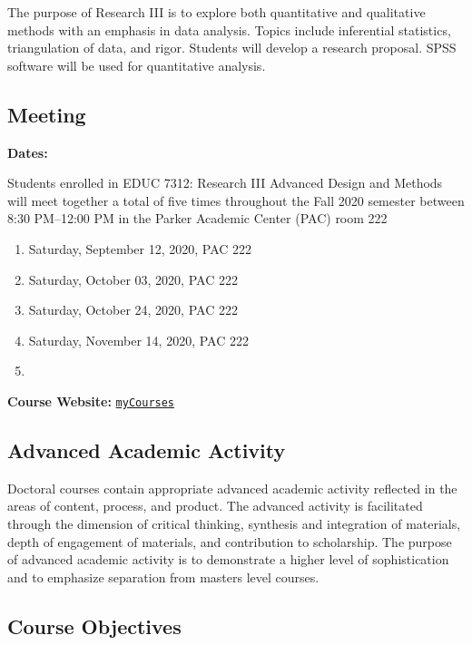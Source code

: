\documentclass[
]{article}
\begin{document}
The purpose of Research III is to explore both quantitative and
qualitative methods with an emphasis in data analysis. Topics include
inferential statistics, triangulation of data, and rigor. Students will
develop a research proposal. SPSS software will be used for quantitative
analysis.

\subsection{Meeting}

\textbf{Dates:}

Students enrolled in EDUC 7312: Research III Advanced Design and Methods
will meet together a total of five times throughout the Fall 2020
semester between 8:30 PM--12:00 PM in the Parker Academic Center (PAC)
room 222

\begin{enumerate}
\def\labelenumi{\arabic{enumi}.}
\item
  Saturday, September 12, 2020, PAC 222
\item
  Saturday, October 03, 2020, PAC 222
\item
  Saturday, October 24, 2020, PAC 222
\item
  Saturday, November 14, 2020, PAC 222
\item
\end{enumerate}

\textbf{Course Website:}
\texttt{\href{https://mycourses.umhb.edu/courses/23599}{myCourses}}

\newpage
\subsection{Advanced Academic Activity}

Doctoral courses contain appropriate advanced academic activity
reflected in the areas of content, process, and product. The advanced
activity is facilitated through the dimension of critical thinking,
synthesis and integration of materials, depth of engagement of
materials, and contribution to scholarship. The purpose of advanced
academic activity is to demonstrate a higher level of sophistication and
to emphasize separation from masters level courses.

\subsection{Course Objectives}
\end{document}
